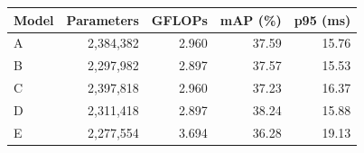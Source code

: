 \begin{tabular}{lrrrr}
\hline
Model & Parameters & GFLOPs & mAP (\%) & p95 (ms) \\
\hline
A & 2,384,382 & 2.960 & 37.59 & 15.76 \\
B & 2,297,982 & 2.897 & 37.57 & 15.53 \\
C & 2,397,818 & 2.960 & 37.23 & 16.37 \\
D & 2,311,418 & 2.897 & 38.24 & 15.88 \\
E & 2,277,554 & 3.694 & 36.28 & 19.13 \\
\hline
\end{tabular}
